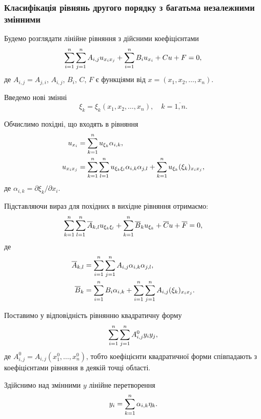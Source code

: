 \subsubsection{Класифікація рівнянь другого порядку з багатьма незалежними змінними}

Будемо розглядати лінійне рівняння з дійсними коефіцієнтами
\begin{equation}
	\displaystyle\sum\limits_{i=1}^n \displaystyle\sum\limits_{j=1}^n A_{i,j} u_{x_i x_j} + \displaystyle\sum\limits_{i=1}^n B_i u_{x_i} + Cu + F = 0,
\end{equation}
де $A_{i,j} = A_{j,i}$, $A_{i,j}$, $B_i$, $C$, $F$ є функціями від $x = (x_1, x_2, \ldots, x_n)$. \medskip

Введемо нові змінні
\begin{equation}
	\xi_k = \xi_k(x_1, x_2, \ldots, x_n), \quad k = \overline{1, n}.
\end{equation}

Обчислимо похідні, що входять в рівняння
\begin{align}
	u_{x_i} &= \displaystyle\sum\limits_{k=1}^n u_{\xi_k} \alpha_{i,k}, \\
	u_{x_i x_j} &= \displaystyle\sum\limits_{k=1}^n \displaystyle\sum\limits_{l=1}^n u_{\xi_k\xi_l} \alpha_{i,k}\alpha_{j,l} + \displaystyle\sum\limits_{k=1}^n u_{\xi_k} (\xi_k)_{x_ix_j},
\end{align}
де $\alpha_{i,k}=\partial\xi_k/\partial x_i$. \medskip

Підставляючи вираз для похідних в вихідне рівняння отримаємо:
\begin{equation}
	\displaystyle\sum\limits_{k=1}^n \displaystyle\sum\limits_{l=1}^n \overline{A}_{k,l} u_{\xi_k\xi_l} + \displaystyle\sum\limits_{k=1}^n \overline{B}_k u_{\xi_k} + \overline{C} u + \overline{F} = 0,
\end{equation}
де
\begin{align}
	\overline{A}_{k,l} &= \displaystyle\sum\limits_{i=1}^n \displaystyle\sum\limits_{j=1}^n A_{i,j}\alpha_{i,k}\alpha_{j,l}, \\
	\overline{B}_k &= \displaystyle\sum\limits_{i=1}^n B_i \alpha_{i,k} + \displaystyle\sum\limits_{i=1}^n \displaystyle\sum\limits_{j=1}^n A_{i,j}(\xi_k)_{x_ix_j}.
\end{align}

Поставимо у відповідність рівнянню квадратичну форму
\begin{equation}
	\displaystyle\sum\limits_{i=1}^n \displaystyle\sum\limits_{j=1}^n A_{i,j}^0 y_iy_j,
\end{equation}
де $A_{i,j}^0=A_{i,j}(x_1^0,\ldots,x_n^0)$, тобто коефіцієнти квадратичної форми співпадають з коефіцієнтами рівняння в деякій точці області. \medskip

Здійснимо над змінними $y$ лінійне перетворення
\begin{equation}
	y_i = \displaystyle\sum\limits_{k=1}^n \alpha_{i,k} \eta_k.
\end{equation}

